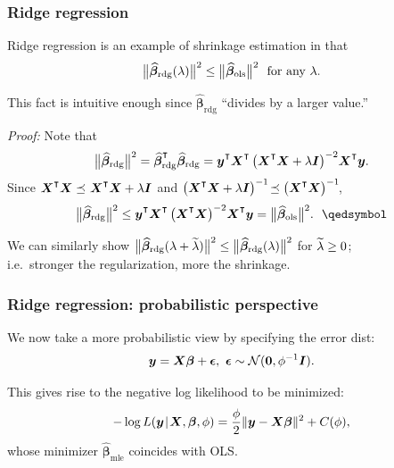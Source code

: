 \documentclass[18pt]{beamer}
\newcommand{\defineTightSpacing}{%
	\setlength{\abovedisplayskip}{.25\baselineskip}%
	\setlength{\belowdisplayskip}{.25\baselineskip}%
}
\renewcommand{\textsc}[1]{{\small \MakeUppercase{#1}}}
\newcommand{\given}{\thinnerspace | \thinnerspace}
\newcommand{\transpose}{\text{\raisebox{.5ex}{$\intercal$}}}
\newcommand{\higherTranspose}{\text{\raisebox{.9ex}{$\intercal$}}}
\newcommand{\thinnerspace}{\mskip.5\thinmuskip}
\newcommand{\normalDist}{\mathcal{N}}
\newcommand{\mle}[1]{\widehat{#1}_{\textrm{mle}}}
\newcommand{\likelihood}{L}
\newcommand{\by}{\bm{y}}
\newcommand{\bX}{\bm{X}}
\newcommand{\bbeta}{\bm{\beta}}
\newcommand{\Id}{\bm{I}}
\begin{document}
\begin{frame}
\frametitle{Ridge regression}
Ridge regression is an example of shrinkage estimation in that
\begin{equation*} \defineTightSpacing%
\big\| \widehat{\bbeta}_{\mathrm{rdg}}(\penaltyParam) \big\|^2
	\leq \big\| \widehat{\bbeta}_{\mathrm{ols}} \big\|^2
	\ \text{ for any } \penaltyParam.
\end{equation*}

This fact is intuitive enough since $\widehat{\bbeta}_{\mathrm{rdg}}$ ``divides by a larger value.''

\textit{Proof:} Note that
\begin{equation*} \defineTightSpacing%
\big\| \widehat{\bbeta}_{\mathrm{rdg}} \big\|^2
	= \widehat{\bbeta}_{\mathrm{rdg}}^\higherTranspose \widehat{\bbeta}_{\mathrm{rdg}}
	= \by^\transpose \bX^\transpose \left( \bX^\transpose \bX + \lambda \Id \right)^{-2} \! \bX^\transpose \by.
\end{equation*}
Since $\bX^\transpose \bX \preceq \thinnerspace \bX^\transpose \bX + \lambda \Id \thinnerspace$ and $\left( \bX^\transpose \bX + \lambda \Id \right)^{-1}\! \preceq \left( \bX^\transpose \bX \right)^{-1}\!$, 
\begin{equation*} \defineTightSpacing%
\big\| \widehat{\bbeta}_{\mathrm{rdg}} \big\|^2
	\leq \by^\transpose \bX^\transpose \left( \bX^\transpose \bX \right)^{-2} \! \bX^\transpose \by
	= \big\| \widehat{\bbeta}_{\mathrm{ols}} \big\|^2. \hspace{1.5ex} \qedsymbol
\end{equation*}

\smallskip
We can similarly show 
$\big\| \widehat{\bbeta}_{\mathrm{rdg}}(\penaltyParam + \widetilde{\penaltyParam}) \big\|^2 
	\leq \big\| \widehat{\bbeta}_{\mathrm{rdg}}(\penaltyParam) \big\|^2$ 
for $\widetilde{\lambda} \geq 0$; \\
i.e.\ stronger the regularization, more the shrinkage.
\end{frame}


\begin{frame}
\frametitle{Ridge regression: probabilistic perspective}
We now take a more probabilistic view by specifying the error dist:
\begin{equation*} \defineTightSpacing%
\by = \bX \bbeta + \bm{\epsilon},
	\ \bm{\epsilon} \sim \normalDist(\bm{0}, \phi^{-1} \Id).
\end{equation*}

This gives rise to the negative log likelihood to be minimized:
\begin{equation*} \defineTightSpacing%
- \log \likelihood(\by \given \bX, \bbeta, \phi)
	= \frac{\phi}{2} \| \by - \bX \bbeta \|^2 + C(\phi),
\end{equation*}
whose minimizer $\mle{\bbeta}$ coincides with \textsc{OLS}.
\end{frame}
\end{document}
